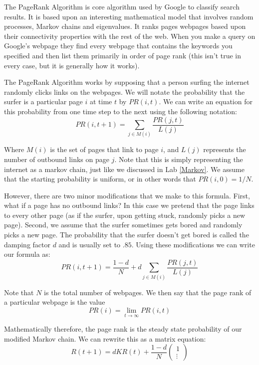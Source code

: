 \label{Ch:PageRank}


The PageRank Algorithm is core algorithm used by Google to classify search results. It is based upon an interesting mathematical model that involves random processes, Markov chains and eigenvalues. It ranks pages webpages based upon their connectivity properties with the rest of the web. When you make a query on Google's webpage they find every webpage that contains the keywords you specified and then list them primarily in order of page rank (this isn't true in every case, but it is generally how it works).

The PageRank Algorithm works by supposing that a person surfing the internet randomly clicks links on the webpages. We will notate the probability that the surfer is a particular page $i$ at time $t$ by $PR(i,t)$. We can write an equation for this probability from one time step to the next using the following notation:
\[
PR(i,t+1) = \sum_{j \in M(i)} \frac{PR(j,t)}{L(j)}
\]

Where $M(i)$ is the set of pages that link to page $i$, and $L(j)$ represents the number of outbound links on page $j$. Note that this is simply representing the internet as a markov chain, just like we discussed in Lab \ref{Markov}. We assume that the starting probability is uniform, or in other words that $PR(i,0) = 1/N$.

However, there are two minor modifications that we make to this formula. First, what if a page has no outbound links? In this case we pretend that the page links to every other page (as if the surfer, upon getting stuck, randomly picks a new page). Second, we assume that the surfer sometimes gets bored and randomly picks a new page. The probability that the surfer doesn't get bored is called the damping factor $d$ and is usually set to $.85$. Using these modifications we can write our formula as:
\[
PR(i,t+1) = \frac{1-d}{N} + d\sum_{j \in M(i)} \frac{PR(j,t)}{L(j)}
\]

Note that $N$ is the total number of webpages. We then say that the page rank of a particular webpage is the value
\[
PR(i) = \lim_{t\to \infty} PR(i,t)
\]

Mathematically therefore, the page rank is the steady state probability of our modified Markov chain. We can rewrite this as a matrix equation:
\[
R(t+1) = d K R(t) + \frac{1-d}{N} \begin{pmatrix}1\\\vdots\end{pmatrix}
\]


